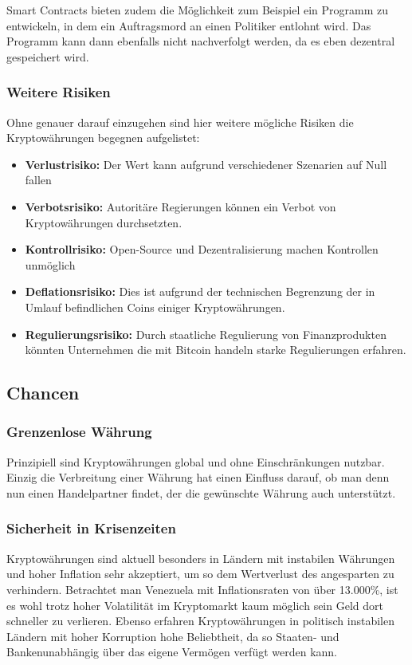 \documentclass[12pt,oneside]{article}
\begin{document}
Smart Contracts bieten zudem die Möglichkeit zum Beispiel ein Programm zu entwickeln, in dem ein Auftragsmord an einen Politiker entlohnt wird. Das Programm kann dann ebenfalls nicht nachverfolgt werden, da es eben dezentral gespeichert wird.  

\subsubsection{Weitere Risiken}
Ohne genauer darauf einzugehen sind hier weitere mögliche Risiken die Kryptowährungen begegnen aufgelistet: 

\begin{itemize}
  \item \textbf{Verlustrisiko:} Der Wert kann aufgrund verschiedener Szenarien auf Null fallen
  \item \textbf{Verbotsrisiko:} Autoritäre Regierungen können ein Verbot von Kryptowährungen durchsetzten.
  \item \textbf{Kontrollrisiko:} Open-Source und Dezentralisierung machen Kontrollen unmöglich
  \item \textbf{Deflationsrisiko:} Dies ist aufgrund der technischen Begrenzung der in Umlauf befindlichen Coins einiger Kryptowährungen. 
  \item \textbf{Regulierungsrisiko:} Durch staatliche Regulierung von Finanzprodukten könnten Unternehmen die mit Bitcoin handeln starke Regulierungen erfahren.
\end{itemize}\cite{neumann2017}

\subsection{Chancen}

\subsubsection{Grenzenlose Währung}
Prinzipiell sind Kryptowährungen global und ohne Einschränkungen nutzbar. Einzig die Verbreitung einer Währung hat einen Einfluss darauf, ob man denn nun einen Handelpartner findet, der die gewünschte Währung auch unterstützt.

\subsubsection{Sicherheit in Krisenzeiten}
Kryptowährungen sind aktuell besonders in Ländern mit instabilen Währungen und hoher Inflation sehr akzeptiert, um so dem Wertverlust des angesparten zu verhindern. Betrachtet man Venezuela mit Inflationsraten von über 13.000\%, ist es wohl trotz hoher Volatilität im Kryptomarkt kaum möglich sein Geld dort schneller zu verlieren. Ebenso erfahren Kryptowährungen in politisch instabilen Ländern mit hoher Korruption hohe Beliebtheit, da so Staaten- und Bankenunabhängig über das eigene Vermögen verfügt werden kann. \cite{rosenberg2019}
\end{document}
